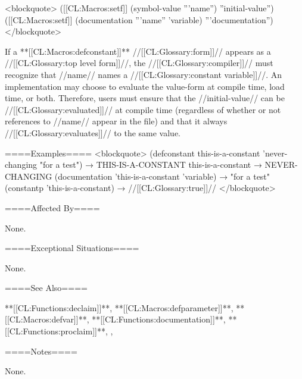 <blockquote> ([[CL:Macros:setf]] (symbol-value '''name'') ''initial-value'') ([[CL:Macros:setf]] (documentation '''name'' 'variable) '''documentation'') </blockquote>

If a **[[CL:Macros:defconstant]]** //[[CL:Glossary:form]]// appears as a //[[CL:Glossary:top level form]]//, the //[[CL:Glossary:compiler]]// must recognize that //name// names a //[[CL:Glossary:constant variable]]//. An implementation may choose to evaluate the value-form at compile time, load time, or both. Therefore, users must ensure that the //initial-value// can be //[[CL:Glossary:evaluated]]// at compile time (regardless of whether or not references to //name// appear in the file) and that it always //[[CL:Glossary:evaluates]]// to the same value.

 

====Examples==== <blockquote> (defconstant this-is-a-constant 'never-changing "for a test") → THIS-IS-A-CONSTANT this-is-a-constant → NEVER-CHANGING (documentation 'this-is-a-constant 'variable) → "for a test" (constantp 'this-is-a-constant) → //[[CL:Glossary:true]]// </blockquote>

====Affected By====

None.

====Exceptional Situations====

None.

====See Also====

**[[CL:Functions:declaim]]**, **[[CL:Macros:defparameter]]**, **[[CL:Macros:defvar]]**, **[[CL:Functions:documentation]]**, **[[CL:Functions:proclaim]]**, {\secref\ConstantVars}, {\secref\Compilation}

====Notes====

None.



   
